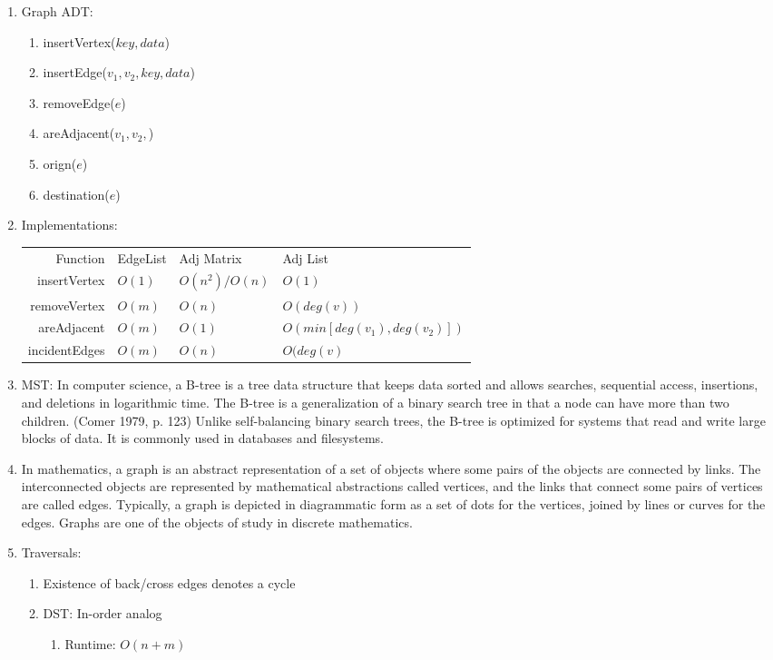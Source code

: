 \documentclass[12pt]{article}
\renewcommand{\=}[1]{\stackrel{#1}{=}} %
\theoremstyle{definition}
\theoremstyle{remark}
\begin{document}
\begin{enumerate}
\begin{enumerate}
    \item Graph ADT:
      \begin{enumerate}
      \item insertVertex($key, data$)
      \item insertEdge($v_1,v_2,key,data$)
      \item removeEdge($e$)
      \item areAdjacent($v_1,v_2,$)
      \item orign($e$)
      \item destination($e$)
      \end{enumerate}

    \item Implementations: 
      \begin{tabular}{ r l l l }
        Function & EdgeList & Adj Matrix & Adj List \\
        insertVertex & $O(1)$ & $O(n^2)/O(n)$ & $O(1)$ \\
        removeVertex & $O(m)$ & $O(n)$ & $O(deg(v))$ \\
        areAdjacent & $O(m)$ & $O(1)$ & $O(min[deg(v_1),deg(v_2)])$\\
        incidentEdges & $O(m)$ & $O(n)$ & $O(deg(v)$\\
      \end{tabular}

    \item MST: In computer science, a B-tree is a tree data structure that keeps data sorted and allows searches, sequential access, insertions, and deletions in logarithmic time. The B-tree is a generalization of a binary search tree in that a node can have more than two children. (Comer 1979, p. 123) Unlike self-balancing binary search trees, the B-tree is optimized for systems that read and write large blocks of data. It is commonly used in databases and filesystems.
    \item In mathematics, a graph is an abstract representation of a set of objects where some pairs of the objects are connected by links. The interconnected objects are represented by mathematical abstractions called vertices, and the links that connect some pairs of vertices are called edges. Typically, a graph is depicted in diagrammatic form as a set of dots for the vertices, joined by lines or curves for the edges. Graphs are one of the objects of study in discrete mathematics.
    \item Traversals:
      \begin{enumerate}
      \item Existence of back/cross edges denotes a cycle
      \item DST: In-order analog
        \begin{enumerate}
        \item Runtime: $O(n+m)$
        \end{enumerate}


\end{enumerate}
\end{enumerate}
\end{enumerate}
\end{document}
